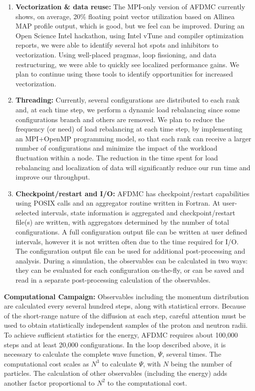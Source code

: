 \documentclass[12pt,letterpaper]{article}
\begin{document}
\begin{enumerate}
\item \textbf{Vectorization \& data reuse:} The MPI-only version of AFDMC 
currently shows, on average, 20\% floating point vector utilization based on 
Allinea MAP profile output, which is good, but we feel can be improved. 
During an Open Science Intel hackathon, using Intel vTune and 
compiler optimization reports, we were able to identify several hot spots 
and inhibitors to vectorization. Using well-placed pragmas, loop fissioning, 
and data restructuring, we were able to quickly see localized performance 
gains. We plan to continue using these tools to identify opportunities for 
increased vectorization.

\item \textbf{Threading:}
Currently, several configurations are distributed to each rank and, at each 
time step, we perform a dynamic load rebalancing since some configurations 
branch and others are removed. We plan to reduce the frequency (or need) of 
load rebalancing at each time step, by implementing an MPI+OpenMP 
programming model, so that each rank can receive a larger number of 
configurations and minimize the impact of the workload fluctuation within a 
node. The reduction in the time spent for load rebalancing and localization 
of data will significantly reduce our run time and improve our throughput.

\item \textbf{Checkpoint/restart and I/O:}
AFDMC has checkpoint/restart capabilities using POSIX calls and an 
aggregator routine written in Fortran. At user-selected intervals, state 
information is aggregated and checkpoint/restart file(s) are written, with 
aggregators determined by the number of total configurations. A full 
configuration output file can be written at user defined intervals, however it
is not written often due to the time required for I/O. The configuration 
output file can be used for additional post-processing and analysis. During 
a simulation, the observables can be calculated in two ways: they can be 
evaluated for each configuration on-the-fly, or can be saved and read in a 
separate post-processing calculation of the observables.
\end{enumerate}

\textbf{Computational Campaign:} Observables including the momentum 
distribution are calculated every several hundred steps, along with 
statistical errors. Because of the short-range nature of the diffusion at 
each step, careful attention must be used to obtain statistically 
independent samples of the proton and neutron radii. To achieve sufficient 
statistics for the energy, AFDMC requires about 100,000 steps and at least 
20,000 configurations. In the loop described above, it is necessary to 
calculate the complete wave function, $\Psi$, several times. The 
computational cost scales as $N^3$ to calculate $\Psi$, with $N$ being the 
number of particles. The calculation of other observables (including the 
energy) adds another factor proportional to $N^2$ to the computational cost.

\newpage


\end{document}
